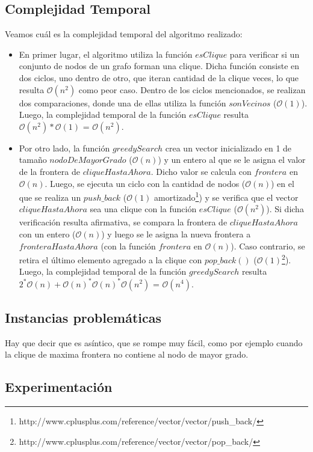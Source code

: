 \subsection{Complejidad Temporal}
Veamos cuál es la complejidad temporal del algoritmo realizado:
\begin{itemize}
\item En primer lugar, el algoritmo utiliza la función $esClique$ para verificar si un conjunto de nodos de un grafo forman una clique. Dicha función consiste en dos ciclos, uno dentro de otro, que iteran cantidad de la clique veces, lo que resulta $\mathcal{O}(n^2)$ como peor caso. Dentro de los ciclos mencionados, se realizan dos comparaciones, donde una de ellas utiliza la función $sonVecinos$ ($\mathcal{O}(1)$). Luego, la complejidad temporal de la función $esClique$ resulta $\mathcal{O}(n^2)*\mathcal{O}(1)$ = $\mathcal{O}(n^2)$.

\item Por otro lado, la función $greedySearch$ crea un vector inicializado en 1 de tamaño $nodoDeMayorGrado$ ($\mathcal{O}(n)$) y un entero al que se le asigna el valor de la frontera de $cliqueHastaAhora$. Dicho valor se calcula con $frontera$ en $\mathcal{O}(n)$. Luego, se ejecuta un ciclo con la cantidad de nodos ($\mathcal{O}(n)$) en el que se realiza un $push\_back$ ($\mathcal{O}(1)$ amortizado\footnote{http://www.cplusplus.com/reference/vector/vector/push\_back/}) y se verifica que el vector $cliqueHastaAhora$ sea una clique con la función $esClique$ ($\mathcal{O}(n^2)$). Si dicha verificación resulta afirmativa, se compara la frontera de $cliqueHastaAhora$ con un entero ($\mathcal{O}(n)$) y luego se le asigna la nueva frontera a $fronteraHastaAhora$ (con la función $frontera$ en $\mathcal{O}(n)$). Caso contrario, se retira el último elemento agregado a la clique con $pop\_back()$ ($\mathcal{O}(1)$\footnote{http://www.cplusplus.com/reference/vector/vector/pop\_back/}).\newline
\newline
Luego, la complejidad temporal de la función $greedySearch$ resulta $2^*\mathcal{O}(n)+\mathcal{O}(n)^*\mathcal{O}(n)^*\mathcal{O}(n^2)$ = $\mathcal{O}(n^4)$.

\end{itemize}
\subsection{Instancias problemáticas}
Hay que decir que es asíntico, que se rompe muy fácil, como por ejemplo cuando la clique de maxima frontera no contiene al nodo de mayor grado.
\subsection{Experimentación}



